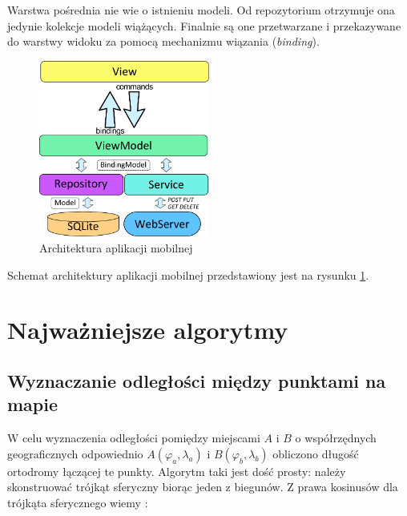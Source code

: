 \documentclass[a4paper]{book}
\begin{document}
			Warstwa pośrednia nie wie o istnieniu modeli. Od repozytorium otrzymuje ona jedynie kolekcje modeli wiążących. Finalnie są one przetwarzane i przekazywane do warstwy widoku za pomocą mechanizmu wiązania (\emph{binding}).
			\begin{figure}
				\centering
				\includegraphics[width=0.5\textwidth]{images/architektura_mobile.pdf}
				\caption{Architektura aplikacji mobilnej}
				\label{fig:architektura_mobile}
			\end{figure}
			
			Schemat architektury aplikacji mobilnej przedstawiony jest na rysunku \ref{fig:architektura_mobile}. 
			
		\section{Najważniejsze algorytmy}
		\label{id:sec:algorytmy}
			\subsection{Wyznaczanie odległości między punktami na mapie}
				
			W celu wyznaczenia odległości pomiędzy miejscami $A$ i $B$ o współrzędnych geograficznych odpowiednio $A(\varphi_a, \lambda_a)$ i $B(\varphi_b, \lambda_b)$ obliczono długość ortodromy łączącej te punkty. Algorytm taki jest dość prosty: należy skonstruować 
			trójkąt sferyczny biorąc jeden z biegunów. Z prawa kosinusów dla trójkąta sferycznego wiemy \cite{id:Mietelski1989Atronomia}:		
		
\end{document}
